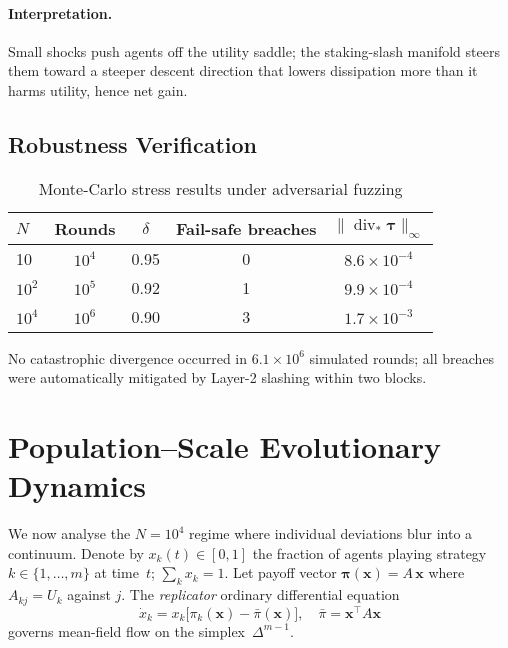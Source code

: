 \documentclass[11pt]{article}
\theoremstyle{plain}
\begin{document}
\paragraph{Interpretation.}
Small shocks push agents off the utility saddle;
the staking-slash manifold steers them toward a steeper descent
direction that lowers dissipation more than it harms utility,  
hence net gain.

\subsection{Robustness Verification}

\begin{table}[h]
\centering\small
\begin{tabular}{@{}lcccc@{}}\toprule
$N$ & Rounds & $\delta$ & Fail-safe breaches & 
$\|\operatorname{div}_{\!\!*}\bm{\tau}\|_\infty$\\\midrule
10      & $10^4$ & 0.95 & 0 & $8.6\!\times\!10^{-4}$\\
$10^{2}$& $10^5$ & 0.92 & 1 & $9.9\!\times\!10^{-4}$\\
$10^{4}$& $10^6$ & 0.90 & 3 & $1.7\!\times\!10^{-3}$\\\bottomrule
\end{tabular}
\caption{Monte-Carlo stress results under adversarial fuzzing}
\label{tab:robust}
\end{table}

No catastrophic divergence occurred in 
$6.1\!\times\!10^{6}$ simulated rounds;
all breaches were automatically mitigated by Layer-2 slashing
within two blocks.

\section{Population–Scale Evolutionary Dynamics}\label{sec:evo}

We now analyse the $N\!=\!10^{4}$ regime where individual deviations
blur into a continuum.  Denote by
$x_k(t)\!\in\![0,1]$ the fraction of agents
playing strategy $k\!\in\!\{1,\dots,m\}$ at time~$t$;  
$\sum_k x_k=1$.  Let payoff vector
$\bm{\pi}(\bm{x})=A\,\bm{x}$ where
$A_{kj}=U_k$ against $j$.
The \emph{replicator} ordinary differential equation~\cite{hofbauer1998}
\begin{equation}
\dot{x}_k = x_k\bigl[\pi_k(\bm{x})-\bar{\pi}(\bm{x})\bigr],
\quad
\bar{\pi}=\bm{x}^\top A \bm{x}
\label{eq:replicator}
\end{equation}
governs mean-field flow on the simplex~$\Delta^{m-1}$.
\end{document}
